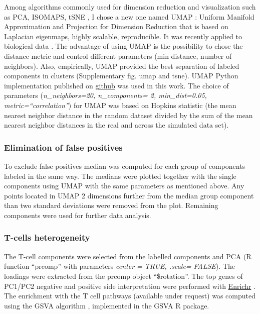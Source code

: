 \documentclass[12pt,]{book}
\theoremstyle{definition}
\theoremstyle{definition}
\theoremstyle{definition}
\theoremstyle{remark}
\begin{document}
Among algorithms commonly used for dimension reduction and visualization
such as PCA, ISOMAPS, tSNE \citep{VanDerMaaten2008}, I chose a new one
named UMAP \citep{Mcinnes2018}: Uniform Manifold Approximation and
Projection for Dimension Reduction that is based on Laplacian eigenmaps,
highly scalable, reproducible. It was recently applied to biological
data \citep{Becht2018}. The advantage of using UMAP is the possibility
to chose the distance metric and control different parameters (min
distance, number of neighbors). Also, empirically, UMAP provided the
best separation of labeled components in clusters (Supplementary fig.
umap and tsne). UMAP Python implementation published on
\href{https://github.com/lmcinnes/umap}{github} was used in this work.
The choice of parameters (\emph{n\_neighbors=20, n\_components= 2,
min\_dist=0.05, metric=``correlation''}) for UMAP was based on Hopkins
statistic \citep{Hopkins1954} (the mean nearest neighbor distance in the
random dataset divided by the sum of the mean nearest neighbor distances
in the real and across the simulated data set).

\hypertarget{elimination-of-false-positives}{%
\subsubsection{Elimination of false
positives}\label{elimination-of-false-positives}}

To exclude false positives median was computed for each group of
components labeled in the same way. The medians were plotted together
with the single components using UMAP with the same parameters as
mentioned above. Any points located in UMAP 2 dimensions further from
the median group component than two standard deviations were removed
from the plot. Remaining components were used for further data analysis.

\hypertarget{t-cells-heterogeneity}{%
\subsubsection{T-cells heterogeneity}\label{t-cells-heterogeneity}}

The T-cell components were selected from the labelled components and PCA
(R function ``prcomp'' with parameters \emph{center = TRUE, .scale=
FALSE}). The loadings were extracted from the prcomp object
``\$rotation''. The top genes of PC1/PC2 negative and positive side
interpretation were performed with
\href{http://amp.pharm.mssm.edu/Enrichr/}{Enrichr} \citep{Chen2013}. The
enrichment with the T cell pathways (available under request) was
computed using the GSVA algorithm \citep{Hanzelmann2013}, implemented in
the GSVA R package.
\end{document}
